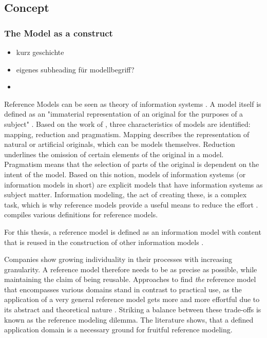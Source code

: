 		\subsection{Concept}
		
		\subsubsection{The Model as a construct}
		
		
		
		\begin{itemize}
			\item kurz geschichte
			\item eigenes subheading für modellbegriff?
			\item 
		\end{itemize}
		Reference Models can be seen as theory of information systems \cite{Schutte1998}. A model itself is defined as an "immaterial representation of an original for the purposes of a subject" \citep[]{Becker2012Gom}. Based on the work of \cite{Stachowiak1973}, three characteristics of models are identified: mapping, reduction and pragmatism.  Mapping describes the representation of natural or artificial originals, which can be models themselves. Reduction underlines the omission of certain elements of the original in a model. Pragmatism means that the selection of parts of the original is dependent on the intent of the model. Based on this notion, models of information systems (or information models in short) are explicit models that have information systems as subject matter. Information modeling, the act of creating these, is a complex task, which is why reference models provide a useful means to reduce the effort \cite{Becker2007}. \cite{thomas2006refmod} compiles various definitions for reference models. 
		
		For this thesis, a reference model is defined as an information model with content that is reused in the construction of other information models \cite{Becker2004}.
		
		Companies show growing individuality in their processes with increasing granularity. A reference model therefore needs to be as precise as possible, while maintaining the claim of being reusable. Approaches to find \textit{the} reference model that encompasses various domains stand in contrast to practical use, as the application of a very general reference model gets more and more effortful due to its abstract and theoretical nature \citep[]{Schutte1998}. Striking a balance between these trade-offs is known as the reference modeling dilemma. The literature shows, that a defined application domain is a necessary ground for fruitful reference modeling.
		
